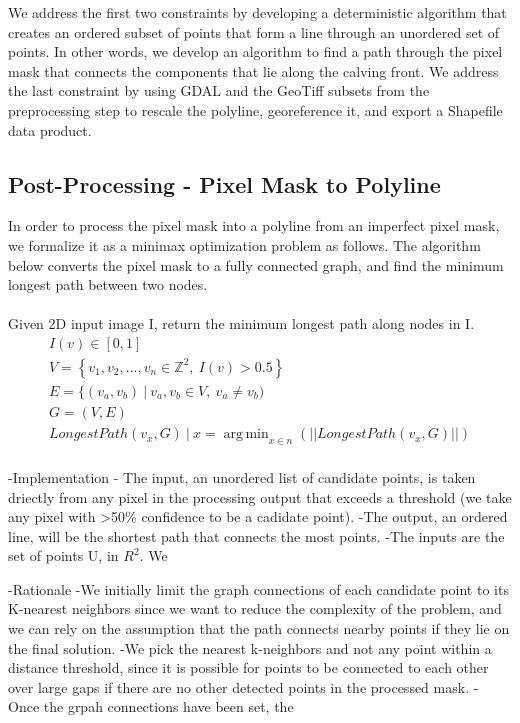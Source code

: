 \documentclass[tc, manuscript]{copernicus}
\DeclareMathOperator*{\argmin}{arg\,min}
\begin{document}
We address the first two constraints by developing a deterministic algorithm that creates an ordered subset of points that form a line through an unordered set of points. In other words, we develop an algorithm to find a path through the pixel mask that connects the components that lie along the calving front.
We address the last constraint by using GDAL and the GeoTiff subsets from the preprocessing step to rescale the polyline, georeference it, and export a Shapefile data product.

\subsection{Post-Processing - Pixel Mask to Polyline}
In order to process the pixel mask into a polyline from an imperfect pixel mask, we formalize it as a minimax optimization problem as follows. The algorithm below converts the pixel mask to a fully connected graph, and find the minimum longest path between two nodes.
\\
\\
Given 2D input image I, return the minimum longest path along nodes in I.
\begin{gather*}
I( v) \in [ 0,1]\\
V=\left\{v_{1}, v_{2},..., v_{n} \in \mathbb{Z}^{2},\ I( v) > 0.5\right\}\\
E=\{(v_{a}, v_{b})\ |\ v_{a},v_{b} \in V,\ v_{a} \neq v_{b})\\
G = ( V, E)\\
LongestPath(v_{x}, G)\ |\ x = \argmin_{x \in n} (||LongestPath(v_{x}, G)||)\\
\end{gather*}


    
-Implementation
- The input, an unordered list of candidate points, is taken driectly from any pixel in the processing output that exceeds a threshold (we take any pixel with >50\% confidence to be a cadidate point).
-The output, an ordered line, will be the shortest path that connects the most points.
-The inputs are the set of points U, in $R^2$.
We 



-Rationale
-We initially limit the graph connections of each candidate point to its K-nearest neighbors since we want to reduce the complexity of the problem, and we can rely on the assumption that the path connects nearby points if they lie on the final solution.
-We pick the nearest k-neighbors and not any point within a distance threshold, since it is possible for points to be connected to each other over large gaps if there are no other detected points in the processed mask.
- Once the grpah connections have been set, the 
\end{document}
